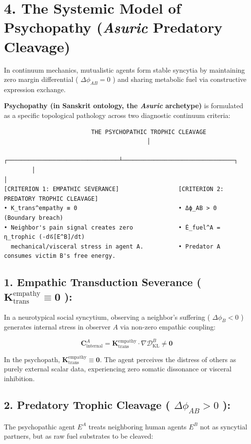 \documentclass[11pt,a4paper]{article}
\theoremstyle{definition}
\theoremstyle{remark}
\begin{document}
\section{4. The Systemic Model of Psychopathy (\textit{Asuric} Predatory Cleavage)}

In continuum mechanics, mutualistic agents form stable syncytia by maintaining zero margin differential ( $\Delta \phi_{AB} = 0$ ) and sharing metabolic fuel via constructive expression exchange.

\textbf{Psychopathy (in Sanskrit ontology, the \textit{Asuric} archetype)} is formulated as a specific topological pathology across two diagnostic continuum criteria:

\begin{verbatim}
                         THE PSYCHOPATHIC TROPHIC CLEAVAGE
                                         │
        ┌────────────────────────────────┴────────────────────────────────┐
        │                                                                 │
[CRITERION 1: EMPATHIC SEVERANCE]                 [CRITERION 2: PREDATORY TROPHIC CLEAVAGE]
• K_trans^empathy ≡ 0                             • Δϕ_AB > 0 (Boundary breach)
• Neighbor's pain signal creates zero             • Ė_fuel^A = η_trophic (-d𝒢[E^B]/dt)
  mechanical/visceral stress in agent A.          • Predator A consumes victim B's free energy.
\end{verbatim}

\subsection{1. Empathic Transduction Severance ( $\mathbf{K}_{\text{trans}}^{\text{empathy}} \equiv \mathbf{0}$ ):}
In a neurotypical social syncytium, observing a neighbor's suffering ( $\Delta \phi_B < 0$ ) generates internal stress in observer $A$ via non-zero empathic coupling:


\begin{equation}
\mathbf{C}_{\text{internal}}^A = \mathbf{K}_{\text{trans}}^{\text{empathy}} \cdot \nabla \mathcal{D}_{\text{KL}}^B \neq \mathbf{0}
\end{equation}


In the psychopath, $\mathbf{K}_{\text{trans}}^{\text{empathy}} \equiv \mathbf{0}$. The agent perceives the distress of others as purely external scalar data, experiencing zero somatic dissonance or visceral inhibition.

\subsection{2. Predatory Trophic Cleavage ( $\Delta \phi_{AB} > 0$ ):}
The psychopathic agent $E^A$ treats neighboring human agents $E^B$ not as syncytial partners, but as raw fuel substrates to be cleaved:
\end{document}
